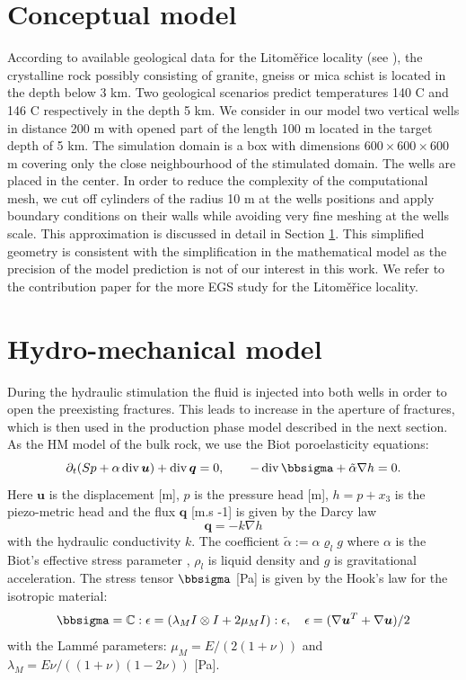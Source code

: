 \documentclass{article}
\newcommand{\CC}{\mathbb C}
\renewcommand{\div}{\operatorname{div}}
\newcommand{\eq}[1]{\begin{equation}#1\end{equation}}
\newcommand{\uu}{\vc u}
\newcommand{\vc}[1]{\boldsymbol{#1}}
\begin{document}
\section{Conceptual model}
According to available geological data for the Litoměřice locality (see \cite{Capova2013}), the crystalline rock possibly consisting of granite, gneiss or mica schist 
is located in the depth
below 3 km. Two geological scenarios predict temperatures 140 C and 146 C respectively in the depth 5 km. We consider in our model two vertical wells in distance 200 m with opened part of the length 100 m located in the target depth of 5 km. The simulation domain is a box with dimensions $600\times600\times600$ m covering only the close neighbourhood of the stimulated domain. The wells are placed in the center. In order to reduce the complexity of the computational mesh, we
cut off cylinders of the radius 10 m at the wells positions and apply boundary conditions on their walls while avoiding very fine meshing at the wells scale.
This approximation is discussed in detail in Section \ref{}.
This simplified geometry is consistent with the simplification in the mathematical model as the precision of the model prediction is not of our interest in this work. We refer to the contribution paper \cite{Ralek} for the more EGS study for the Litoměřice locality.



\section{Hydro-mechanical model}
\label{sc:hm_model}
During the hydraulic stimulation the fluid is injected into both wells in order to open the preexisting fractures. This leads to increase in the aperture of fractures, which is then used in the production phase model described in the next section.
As the HM model of the bulk rock, we use the Biot poroelasticity equations:
\eq{\label{eq:biot} \partial_t(Sp + \alpha\div\uu) +\div\vc q = 0,\qquad -\div\bbsigma + \tilde\alpha\nabla h = 0. }
Here $\uu$ is the displacement [m], $p$ is the pressure head [m], $h=p+x_3$ is the piezo-metric head and the flux $\vc q$ [m.s -1] is given by the Darcy law
\eq{ \vc q = - k\nabla h}
with the hydraulic conductivity $k$. The coefficient $\tilde\alpha:=\alpha\varrho_l g$ where $\alpha$ is the Biot's effective stress parameter \cite{Biot1941},
$\rho_l$ is liquid density and $g$ is gravitational acceleration.
The stress tensor $\bbsigma$ [Pa] is given by the Hook's law
for the isotropic material:
\eq{ \bbsigma = \CC : \epsilon 
= (\lambda_M I\otimes I +2\mu_M I):\epsilon, \quad \epsilon = (\nabla \uu^T + \nabla \uu)/2}
with the Lamm\' e parameters: $\mu_M=E/(2(1+\nu))$ and $\lambda_M=E\nu/((1+\nu)(1-2\nu))$ [Pa].
\end{document}

